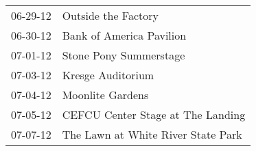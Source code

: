 \begin{supertabular}{p{0.07\textwidth}p{0.23\textwidth}}
 06-29-12 &                 Outside the Factory \\
 06-30-12 &            Bank of America Pavilion \\
 07-01-12 &              Stone Pony Summerstage \\
 07-03-12 &                   Kresge Auditorium \\
 07-04-12 &                    Moonlite Gardens \\
 07-05-12 &   CEFCU Center Stage at The Landing \\
 07-07-12 &  The Lawn at White River State Park \\
\end{supertabular}
